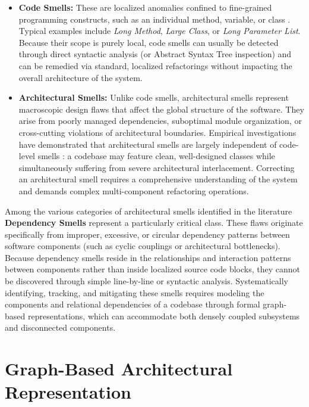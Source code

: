 \begin{itemize}
  \item \textbf{Code Smells:} These are localized anomalies confined to
    fine-grained programming constructs, such as an individual method,
    variable, or class \cite{arcelli_fontana_automatic_2012}. Typical
    examples include \textit{Long Method},
    \textit{Large Class}, or \textit{Long Parameter List}. Because their
    scope is purely local, code smells can usually be detected through
    direct syntactic analysis (or Abstract Syntax Tree inspection) and can be
    remedied via standard, localized refactorings without impacting the
    overall architecture of the system.
  \item \textbf{Architectural Smells:} Unlike code smells, architectural
    smells \cite{garcia_identifying_2009}
    represent macroscopic design flaws that affect the global structure of the
    software. They arise from poorly managed dependencies, suboptimal module
    organization, or cross-cutting violations of architectural boundaries.
    Empirical investigations have demonstrated that architectural smells are
    largely independent of code-level smells
    \cite{arcelli_fontana_independent_2019}:
    a codebase may feature clean, well-designed classes while simultaneously
    suffering from severe architectural interlacement. Correcting an
    architectural smell requires a comprehensive understanding of the system and
    demands complex multi-component refactoring operations.
\end{itemize}

Among the various categories of architectural smells identified in
the literature \textbf{Dependency Smells} represent a particularly
critical class. These flaws originate specifically from improper,
excessive, or circular dependency patterns between software
components (such as cyclic couplings or architectural bottlenecks).
Because dependency smells reside in the relationships and interaction
patterns between components rather than inside localized source code
blocks, they cannot be discovered through simple line-by-line or
syntactic analysis. Systematically identifying, tracking, and
mitigating these smells requires modeling the components and
relational dependencies of a codebase through formal graph-based
representations, which can accommodate both densely coupled
subsystems and disconnected components.

\section{Graph-Based Architectural Representation}
\label{sec:dependency_graphs}

